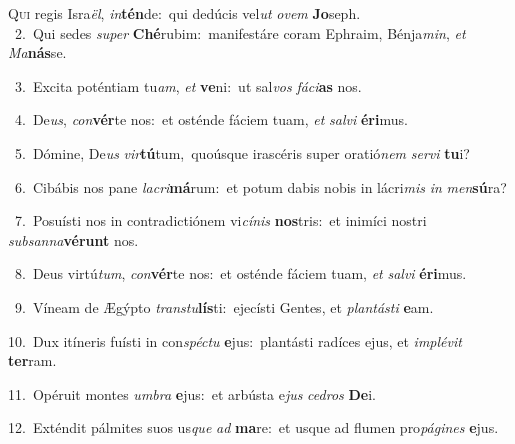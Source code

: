 \lettrine{\initial\textcolor{\initialcolor}{Q}}{ui} regis Isra\-\textit{ël}\-, \textit{in}\-\textbf{tén}de:~\star qui dedúcis vel\textit{ut} \textit{o}\-\textit{vem} \textbf{Jo}\-seph.\\
{\numbfont\textcolor{\numbcolor}{~2.}}~Qui sedes \textit{su}\-\textit{per} \textbf{Ché}\-rubim:~\star manifestáre coram Ephraim, Bénja\-\textit{min}\-, \textit{et} \textit{Ma}\-\textbf{nás}se.\par
{\numbfont\textcolor{\numbcolor}{~3.}}~Excita poténtiam tu\-\textit{am}\-, \textit{et} \textbf{ve}\-ni:~\star ut sal\textit{vos} \textit{fá}\-\textit{ci}\textbf{as} nos.\par
{\numbfont\textcolor{\numbcolor}{~4.}}~De\-\textit{us}\-, \textit{con}\-\textbf{vér}te nos:~\star et osténde fáciem tuam, \textit{et} \textit{sal}\-\textit{vi} \textbf{é}\-\textbf{ri}mus.\par
{\numbfont\textcolor{\numbcolor}{~5.}}~Dómine, De\textit{us} \textit{vir}\-\textbf{tú}tum,~\star quoúsque irascéris super oratió\textit{nem} \textit{ser}\-\textit{vi} \textbf{tu}\-i?\par
{\numbfont\textcolor{\numbcolor}{~6.}}~Cibábis nos pane \textit{la}\-\textit{cri}\textbf{má}rum:~\star et potum dabis nobis in lácri\textit{mis} \textit{in} \textit{men}\-\textbf{sú}ra?\par
{\numbfont\textcolor{\numbcolor}{~7.}}~Posuísti nos in contradictiónem vi\-\textit{cí}\-\textit{nis} \textbf{nos}\-tris:~\star et inimíci nostri \textit{sub}\-\textit{san}\textit{na}\textbf{vé}\textbf{runt} nos.\par
{\numbfont\textcolor{\numbcolor}{~8.}}~Deus virtú\-\textit{tum}\-, \textit{con}\-\textbf{vér}te nos:~\star et osténde fáciem tuam, \textit{et} \textit{sal}\-\textit{vi} \textbf{é}\-\textbf{ri}mus.\par
{\numbfont\textcolor{\numbcolor}{~9.}}~Víneam de Ægýpto \textit{trans}\-\textit{tu}\textbf{lís}ti:~\star ejecísti Gentes, et \textit{plan}\-\textit{tás}\textit{ti} \textbf{e}\-am.\par
{\numbfont\textcolor{\numbcolor}{10.}}~Dux itíneris fuísti in con\-\textit{spéc}\-\textit{tu} \textbf{e}\-jus:~\star plantásti radíces ejus, et \textit{im}\-\textit{plé}\textit{vit} \textbf{ter}\-ram.\par
{\numbfont\textcolor{\numbcolor}{11.}}~Opéruit montes \textit{um}\-\textit{bra} \textbf{e}\-jus:~\star et arbústa e\textit{jus} \textit{ce}\-\textit{dros} \textbf{De}\-i.\par
{\numbfont\textcolor{\numbcolor}{12.}}~Exténdit pálmites suos us\textit{que} \textit{ad} \textbf{ma}\-re:~\star et usque ad flumen pro\-\textit{pá}\-\textit{gi}\textit{nes} \textbf{e}\-jus.\par
